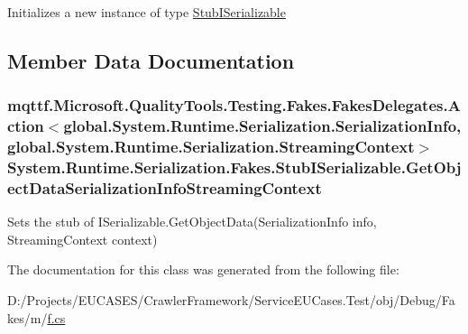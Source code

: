 Initializes a new instance of type \hyperlink{class_system_1_1_runtime_1_1_serialization_1_1_fakes_1_1_stub_i_serializable}{Stub\-I\-Serializable}



\subsection{Member Data Documentation}
\hypertarget{class_system_1_1_runtime_1_1_serialization_1_1_fakes_1_1_stub_i_serializable_af7e732db80a5b3d3d0b1652e352d0601}{
\subsubsection[{Get\-Object\-Data\-Serialization\-Info\-Streaming\-Context}]{\setlength{\rightskip}{0pt plus 5cm}mqttf.\-Microsoft.\-Quality\-Tools.\-Testing.\-Fakes.\-Fakes\-Delegates.\-Action$<$global.\-System.\-Runtime.\-Serialization.\-Serialization\-Info, global.\-System.\-Runtime.\-Serialization.\-Streaming\-Context$>$ System.\-Runtime.\-Serialization.\-Fakes.\-Stub\-I\-Serializable.\-Get\-Object\-Data\-Serialization\-Info\-Streaming\-Context}}\label{class_system_1_1_runtime_1_1_serialization_1_1_fakes_1_1_stub_i_serializable_af7e732db80a5b3d3d0b1652e352d0601}


Sets the stub of I\-Serializable.\-Get\-Object\-Data(\-Serialization\-Info info, Streaming\-Context context)



The documentation for this class was generated from the following file\-:\begin{DoxyCompactItemize}
\item 
D\-:/\-Projects/\-E\-U\-C\-A\-S\-E\-S/\-Crawler\-Framework/\-Service\-E\-U\-Cases.\-Test/obj/\-Debug/\-Fakes/m/\hyperlink{m_2f_8cs}{f.\-cs}\end{DoxyCompactItemize}
